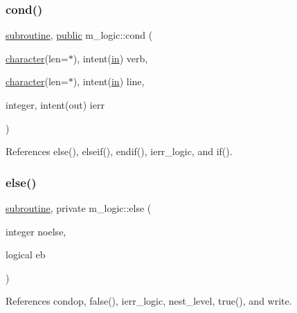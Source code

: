 \subsubsection{\texorpdfstring{cond()}{cond()}}
{\footnotesize\ttfamily \hyperlink{M__stopwatch_83_8txt_acfbcff50169d691ff02d4a123ed70482}{subroutine}, \hyperlink{M__stopwatch_83_8txt_a2f74811300c361e53b430611a7d1769f}{public} m\+\_\+logic\+::cond (\begin{DoxyParamCaption}\item[{\hyperlink{option__stopwatch_83_8txt_abd4b21fbbd175834027b5224bfe97e66}{character}(len=$\ast$), intent(\hyperlink{M__journal_83_8txt_afce72651d1eed785a2132bee863b2f38}{in})}]{verb,  }\item[{\hyperlink{option__stopwatch_83_8txt_abd4b21fbbd175834027b5224bfe97e66}{character}(len=$\ast$), intent(\hyperlink{M__journal_83_8txt_afce72651d1eed785a2132bee863b2f38}{in})}]{line,  }\item[{integer, intent(out)}]{ierr }\end{DoxyParamCaption})}



References else(), elseif(), endif(), ierr\+\_\+logic, and if().

\mbox{\label{namespacem__logic_ac51075acbd12f22ae97edd87352cba67}} 
\subsubsection{\texorpdfstring{else()}{else()}}
{\footnotesize\ttfamily \hyperlink{M__stopwatch_83_8txt_acfbcff50169d691ff02d4a123ed70482}{subroutine}, private m\+\_\+logic\+::else (\begin{DoxyParamCaption}\item[{integer}]{noelse,  }\item[{logical}]{eb }\end{DoxyParamCaption})\hspace{0.3cm}{\ttfamily [private]}}



References condop, false(), ierr\+\_\+logic, nest\+\_\+level, true(), and write.

\mbox{\label{namespacem__logic_abb56458f58725800b593e986b23ec2d3}} 
